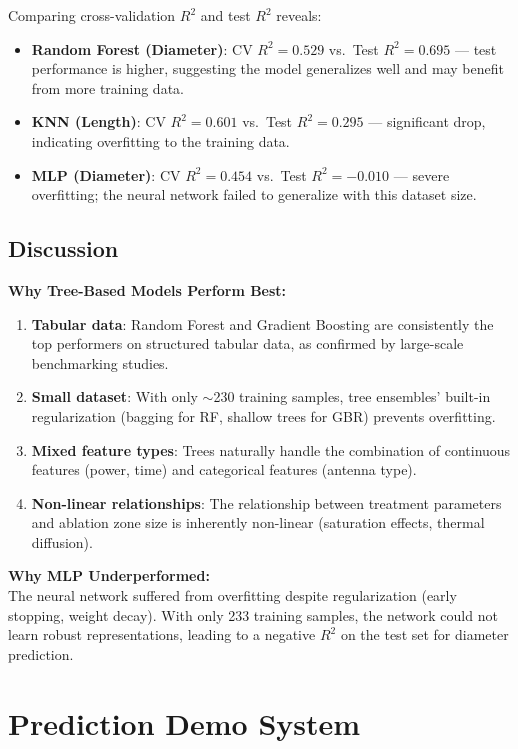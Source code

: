 \documentclass[12pt, a4paper]{article}
\begin{document}
Comparing cross-validation $R^2$ and test $R^2$ reveals:
\begin{itemize}
    \item \textbf{Random Forest (Diameter)}: CV $R^2 = 0.529$ vs.\ Test $R^2 = 0.695$ --- test performance is higher, suggesting the model generalizes well and may benefit from more training data.
    \item \textbf{KNN (Length)}: CV $R^2 = 0.601$ vs.\ Test $R^2 = 0.295$ --- significant drop, indicating overfitting to the training data.
    \item \textbf{MLP (Diameter)}: CV $R^2 = 0.454$ vs.\ Test $R^2 = -0.010$ --- severe overfitting; the neural network failed to generalize with this dataset size.
\end{itemize}

\subsection{Discussion}
\label{sec:discussion}

\textbf{Why Tree-Based Models Perform Best:}
\begin{enumerate}
    \item \textbf{Tabular data}: Random Forest and Gradient Boosting are consistently the top performers on structured tabular data, as confirmed by large-scale benchmarking studies.
    \item \textbf{Small dataset}: With only $\sim$230 training samples, tree ensembles' built-in regularization (bagging for RF, shallow trees for GBR) prevents overfitting.
    \item \textbf{Mixed feature types}: Trees naturally handle the combination of continuous features (power, time) and categorical features (antenna type).
    \item \textbf{Non-linear relationships}: The relationship between treatment parameters and ablation zone size is inherently non-linear (saturation effects, thermal diffusion).
\end{enumerate}

\textbf{Why MLP Underperformed:}\\
The neural network suffered from overfitting despite regularization (early stopping, weight decay). With only 233 training samples, the network could not learn robust representations, leading to a negative $R^2$ on the test set for diameter prediction.

\section{Prediction Demo System}
\label{sec:demo}
\end{document}
